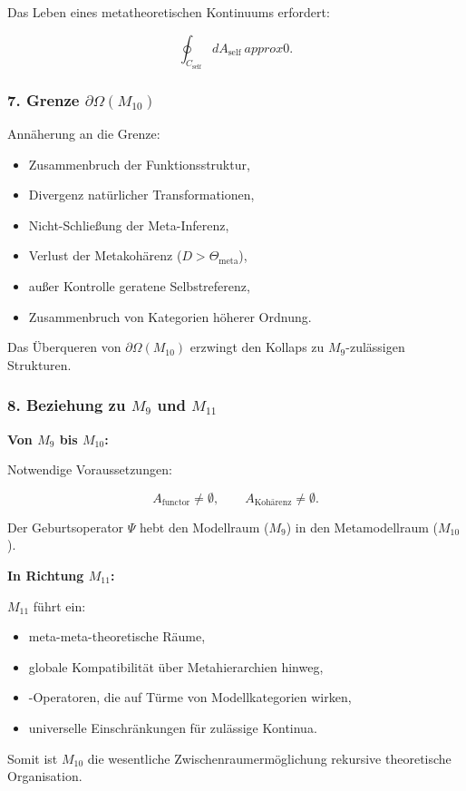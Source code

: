 Das Leben eines metatheoretischen Kontinuums erfordert:

\[
\oint_{C_{\mathrm{self}}} dA_{\mathrm{self}} \ approx 0.
\]

\subsubsection*{7. Grenze $\partial\Omega(M_{10})$}

Annäherung an die Grenze:

\begin{itemize}
    \item Zusammenbruch der Funktionsstruktur,
    \item Divergenz natürlicher Transformationen,
    \item Nicht-Schließung der Meta-Inferenz,
    \item Verlust der Metakohärenz ($D>\Theta_{\mathrm{meta}}$),
    \item außer Kontrolle geratene Selbstreferenz,
    \item Zusammenbruch von Kategorien höherer Ordnung.
\end{itemize}

Das Überqueren von $\partial\Omega(M_{10})$ erzwingt den Kollaps zu $M_9$-zulässigen Strukturen.

\subsubsection*{8. Beziehung zu \texorpdfstring{$M_9$}{M_9} und $M_{11}$}

\textbf{Von $M_9$ bis $M_{10}$:}

Notwendige Voraussetzungen:

\[
A_{\mathrm{functor}}\neq\emptyset,\qquad
A_{\mathrm{Kohärenz}}\neq\emptyset.
\]

Der Geburtsoperator $\Psi$ hebt den Modellraum ($M_9$) in den Metamodellraum ($M_{10}$).

\textbf{In Richtung $M_{11}$:}

$M_{11}$ führt ein:

\begin{itemize}
    \item meta-meta-theoretische Räume,
    \item globale Kompatibilität über Metahierarchien hinweg,
    \item-Operatoren, die auf Türme von Modellkategorien wirken,
    \item universelle Einschränkungen für zulässige Kontinua.
\end{itemize}

Somit ist $M_{10}$ die wesentliche Zwischenraumermöglichung
rekursive theoretische Organisation.

